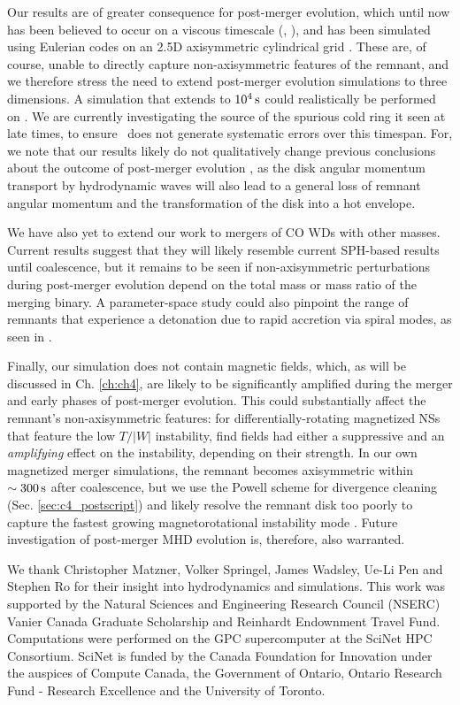 Our results are of greater consequence for post-merger evolution, which until now has been believed to occur on a viscous timescale (\citeal{vkercj10}, \citealt{shen+12}), and has been simulated using Eulerian codes on an 2.5D  axisymmetric cylindrical grid \citep{schw+12,ji+13}.  These are, of course, unable to directly capture non-axisymmetric features of the remnant, and we therefore stress the need to extend post-merger evolution simulations to three dimensions.  A simulation that extends to $10^4\,\mathrm{s}$ could realistically be performed on \arepo.  We are currently investigating the source of the spurious cold ring it seen at late times, to ensure \arepo\ does not generate systematic errors over this timespan.  For, we note that our results likely do not qualitatively change previous conclusions about the outcome of post-merger evolution \citep{schw+12,ji+13}, as the disk angular momentum transport by hydrodynamic waves will also lead to a general loss of remnant angular momentum and the transformation of the disk into a hot envelope.

We have also yet to extend our work to mergers of CO WDs with other masses.  Current results suggest that they will likely resemble current SPH-based results until coalescence, but it remains to be seen if non-axisymmetric perturbations during post-merger evolution depend on the total mass or mass ratio of the merging binary.  A parameter-space study could also pinpoint the range of remnants that experience a detonation due to rapid accretion via spiral modes, as seen in \cite{kash+15}.

Finally, our simulation does not contain magnetic fields, which, as will be discussed in Ch. \ref{ch:ch4}, are likely to be significantly amplified during the merger and early phases of post-merger evolution.  This could substantially affect the remnant's non-axisymmetric features: for differentially-rotating magnetized NSs that feature the low $T/|W|$ instability, \cite{muhl+14} find fields had either a suppressive and an \textit{amplifying} effect on the instability, depending on their strength.  In our own magnetized merger simulations, the remnant becomes axisymmetric within $\sim300\,\mathrm{s}$ after coalescence, but we use the Powell scheme for divergence cleaning (Sec. \ref{sec:c4_postscript}) and likely resolve the remnant disk too poorly to capture the fastest growing magnetorotational instability mode \citep{ji+13}.  Future investigation of post-merger MHD evolution is, therefore, also warranted.

We thank Christopher Matzner, Volker Springel, James Wadsley, Ue-Li Pen and Stephen Ro for their insight into hydrodynamics and simulations.  This work was supported by the Natural Sciences and Engineering Research Council (NSERC) Vanier Canada Graduate Scholarship and Reinhardt Endownment Travel Fund.  Computations were performed on the GPC supercomputer at the SciNet HPC Consortium.  SciNet \citep{loke+10} is funded by the Canada Foundation for Innovation under the auspices of Compute Canada, the Government of Ontario, Ontario Research Fund - Research Excellence and the University of Toronto.

